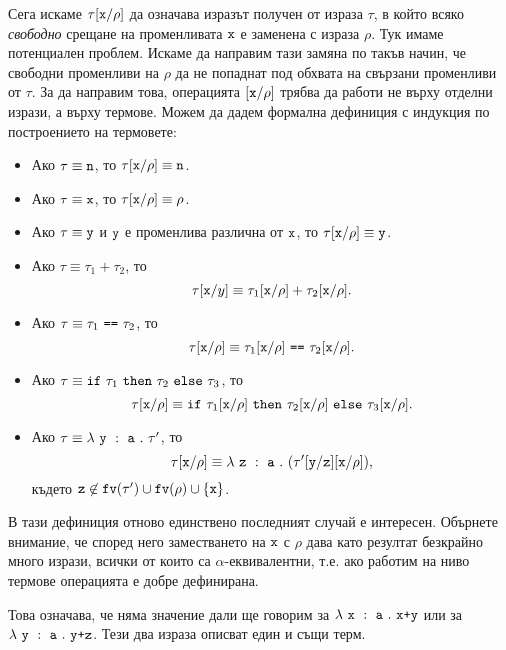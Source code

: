Сега искаме $\tau[\texttt{x}/{\rho}]$ да означава изразът получен от израза $\tau$, в който всяко \emph{свободно} срещане на променливата $\texttt{x}$
е заменена с израза $\rho$. Тук имаме потенциален проблем. Искаме да направим тази замяна по такъв начин, че свободни променливи на $\rho$
да не попаднат под обхвата на свързани променливи от $\tau$. За да направим това, операцията $[\texttt{x}/{\rho}]$
трябва да работи не върху отделни изрази, а върху термове.
Можем да дадем формална дефиниция с индукция по построението на термовете:
\begin{itemize}
\item
  Ако $\tau \equiv \texttt{n}$, то $\tau[\texttt{x}/{\rho}] \equiv \texttt{n}$.
\item
  Ако $\tau \equiv \texttt{x}$, то $\tau[\texttt{x}/{\rho}] \equiv \rho$.
\item
  Ако $\tau \equiv \texttt{y}$ и $\texttt{y}$ е променлива различна от $\texttt{x}$, то $\tau[\texttt{x}/{\rho}] \equiv \texttt{y}$.
\item
  Ако $\tau \equiv \tau_1 + \tau_2$, то
  \[\tau[\texttt{x}/{y}] \equiv \tau_1[\texttt{x}/{\rho}] + \tau_2[\texttt{x}/{\rho}].\]
\item
  Ако $\tau \equiv \tau_1\ \vv{==}\ \tau_2$, то
  \[\tau\subst{x}{\rho} \equiv \tau_1\subst{x}{\rho}\ \vv{==}\ \tau_2\subst{x}{\rho}.\]
\item
  Ако $\tau \equiv \texttt{if}\ \tau_1\ \texttt{then}\ \tau_2\ \texttt{else}\ \tau_3$, то
  \[\tau[\texttt{x}/{\rho}] \equiv \texttt{if}\ \tau_1[\texttt{x}/{\rho}]\ \texttt{then}\ \tau_2[\texttt{x}/{\rho}]\ \texttt{else}\ \tau_3[\texttt{x}/{\rho}].\]
\item
  Ако $\tau \equiv \lambda~\texttt{y}~:~\texttt{a}~.~{\tau'}$, то
  \[\tau[\texttt{x}/{\rho}] \equiv \lambda~\texttt{z}~:~\texttt{a}~.~{(\tau'[\texttt{y}/{\texttt{z}}][\texttt{x}/{\rho}])},\]
  където $\texttt{z} \not\in \texttt{fv}(\tau') \cup \texttt{fv}(\rho) \cup \{\texttt{x}\}$.
\end{itemize}

В тази дефиниция отново единствено последният случай е интересен.
Обърнете внимание, че според него заместването на $\texttt{x}$ с $\rho$ дава като резултат безкрайно много
изрази, всички от които са $\alpha$-еквивалентни, т.е. ако работим на ниво термове операцията е добре дефинирана.

Това означава, че няма значение дали ще говорим за $\lambda~\texttt{x}~:~\texttt{a}~.~{\texttt{x+y}}$ или за $\lambda~\texttt{y}~:~\texttt{a}~.~{\texttt{y+z}}$.
Тези два израза описват един и същи терм.

